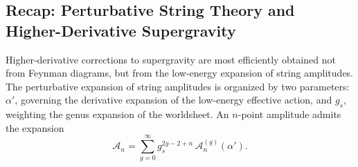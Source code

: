 

\subsection{Recap: Perturbative String Theory and Higher-Derivative Supergravity}
Higher-derivative corrections to supergravity are most efficiently obtained not from Feynman diagrams, but from the low-energy expansion of string amplitudes.
The perturbative expansion of string amplitudes is organized by two parameters: $\alpha'$, governing the derivative expansion of the low-energy effective action, and $g_s$, weighting the genus expansion of the worldsheet. An $n$-point amplitude admits the expansion
\begin{equation}
    \mathcal A_n = \sum_{g=0}^\infty g_s^{2g-2+n}\, \mathcal A_n^{(g)}(\alpha').
\end{equation}

